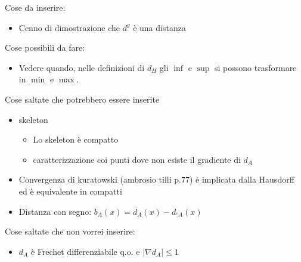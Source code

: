 \documentclass[a4paper,10pt]{article}
\theoremstyle{plain}
\theoremstyle{definition}
\theoremstyle{remark}
\newcommand{\abs}[1]{\left|#1\right|}
\begin{document}
Cose da inserire:
\begin{itemize}
\item Cenno di dimostrazione che $d^g$ è una distanza
\end{itemize}

Cose possibili da fare:

\begin{itemize}
\item Vedere quando, nelle definizioni di $d_H$ gli $\inf$ e $\sup$ si
  possono trasformare in $\min$ e $\max$.
\end{itemize}


Cose saltate che potrebbero essere inserite
\begin{itemize}
\item skeleton
  \begin{itemize}
  \item Lo skeleton è compatto
  \item caratterizzazione coi punti dove non esiste il gradiente di
    $d_A$
  \end{itemize}
\item Convergenza di kuratowski (ambrosio tilli p.77) è implicata
  dalla Hausdorff ed è equivalente in compatti
\item Distanza con segno: $b_A(x) = d_A(x) - d_{^cA}(x)$
\end{itemize}


Cose saltate che non vorrei inserire:
\begin{itemize}
\item $d_A$ è Frechet differenziabile q.o. e $\abs{\nabla d_A} \le 1$
\end{itemize}
\end{document}
